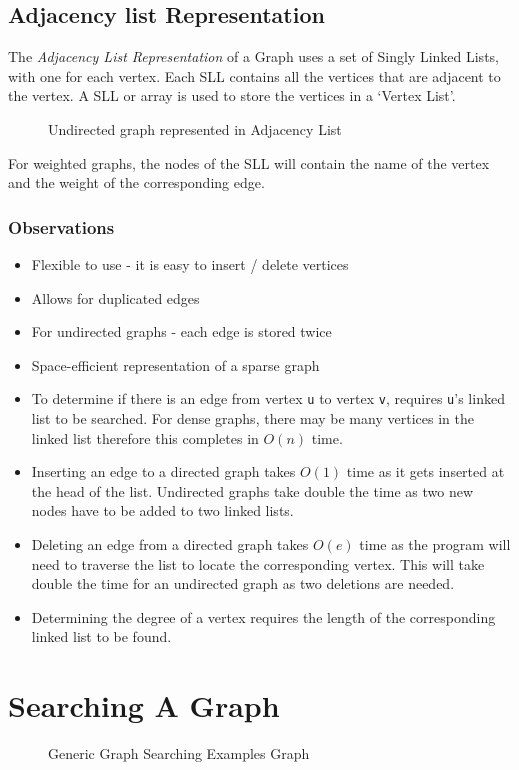 \subsection{Adjacency list Representation}
The \textit{Adjacency List Representation} of a Graph uses a set of Singly Linked Lists, with one for each vertex. Each SLL contains all the vertices that are adjacent to the vertex. A SLL or array is used to store the vertices in a `Vertex List'. 
\begin{figure}[H]
    \centering
    
    \caption{Undirected graph represented in Adjacency List}
\end{figure}

For weighted graphs, the nodes of the SLL will contain the name of the vertex and the weight of the corresponding edge.

\subsubsection{Observations}
\begin{itemize}
    \item Flexible to use - it is easy to insert / delete vertices
    \item Allows for duplicated edges
    \item For undirected graphs - each edge is stored twice
    \item Space-efficient representation of a sparse graph
    \item To determine if there is an edge from vertex \verb|u| to vertex \verb|v|, requires \verb|u|'s linked list to be searched. For dense graphs, there may be many vertices in the linked list therefore this completes in $O(n)$ time. 
    \item Inserting an edge to a directed graph takes $O(1)$ time as it gets inserted at the head of the list. Undirected graphs take double the time as two new nodes have to be added to two linked lists.
    \item Deleting an edge from a directed graph takes $O(e)$ time as the program will need to traverse the list to locate the corresponding vertex. This will take double the time for an undirected graph as two deletions are needed. 
    \item Determining the degree of a vertex requires the length of the corresponding linked list to be found. 
\end{itemize}

\section{Searching A Graph}
\begin{figure}[H]
    \centering
    
    \caption{Generic Graph Searching Examples Graph}
\end{figure}

